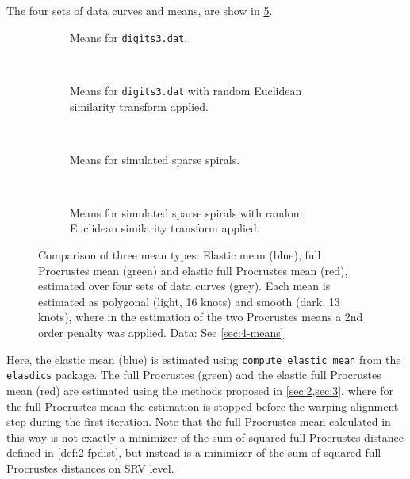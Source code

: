 The four sets of data curves and means, are show in \cref{fig:4-means}.
\begin{figure}
  \centering
  \begin{subfigure}{\textwidth}
    \centering
    \caption{Means for \texttt{digits3.dat}.}
    \label{fig:41-digit3-means-a}
  \end{subfigure}\vspace{0.66em}\\
  \begin{subfigure}{\textwidth}
    \centering
    \caption{Means for \texttt{digits3.dat} with random Euclidean similarity transform applied.}
    \label{fig:41-digit3-means-b}
  \end{subfigure}\vspace{0.66em}\\
  \begin{subfigure}{\textwidth}
    \centering
    \caption{Means for simulated sparse spirals.}
    \label{fig:41-spiral-means-a}
  \end{subfigure}\vspace{0.66em}\\
  \begin{subfigure}{\textwidth}
    \centering
    \caption{Means for simulated sparse spirals with random Euclidean similarity transform applied.}
    \label{fig:41-spiral-means-b}
  \end{subfigure}
  \caption{Comparison of three mean types: Elastic mean (blue), full Procrustes mean (green) and elastic full Procrustes mean (red), estimated over four sets of data curves (grey).
  Each mean is estimated as polygonal (light, 16 knots) and smooth (dark, 13 knots), where in the estimation of the two Procrustes means a 2nd order penalty was applied.
  Data: See \cref{sec:4-means}}
  \label{fig:4-means}
\end{figure}
Here, the elastic mean (blue) is estimated using \texttt{compute\_elastic\_mean} from the \texttt{elasdics} package.
The full Procrustes (green) and the elastic full Procrustes mean (red) are estimated using the methods proposed in \cref{sec:2,sec:3}, where for the full Procrustes mean the estimation is stopped before the warping alignment step during the first iteration.
Note that the full Procrustes mean calculated in this way is not exactly a minimizer of the sum of squared full Procrustes distance defined in \cref{def:2-fpdist}, but instead is a minimizer of the sum of squared full Procrustes distances on SRV level.
